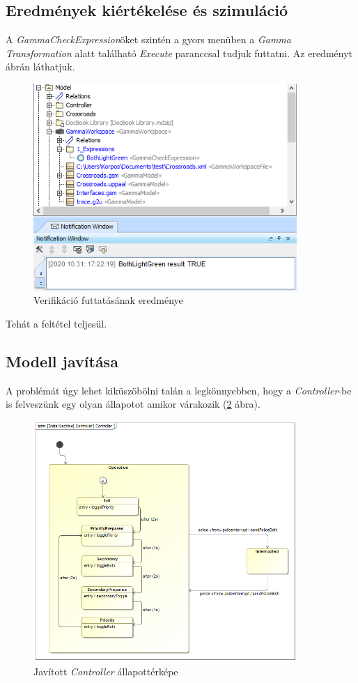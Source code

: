 \newpage

\subsection{Eredmények kiértékelése és szimuláció}

A \emph{GammaCheckExpression}öket szintén a gyors menüben a  \emph{Gamma Transformation} alatt található \emph{Execute} paranccsal tudjuk futtatni. Az eredményt  ábrán láthatjuk.

\begin{figure}[!ht]
	\centering
	\includegraphics[width=10cm, keepaspectratio]{figures/contribution/verif1.png}
	\caption{Verifikáció futtatásának eredménye}
	\label{fig:verif1}
\end{figure}


Tehát a feltétel teljesül.


\subsection{Modell javítása}

A problémát úgy lehet kiküszöbölni talán a legkönnyebben, hogy a \emph{Controller}-be is felveszünk egy olyan állapotot amikor várakozik (\ref{fig:fixed} ábra).

\begin{figure}[!ht]
	\centering
	\includegraphics[width=10cm, keepaspectratio]{figures/contribution/ControllerFixed.png}
	\caption{Javított \emph{Controller} állapottérképe}
	\label{fig:fixed}
\end{figure}

